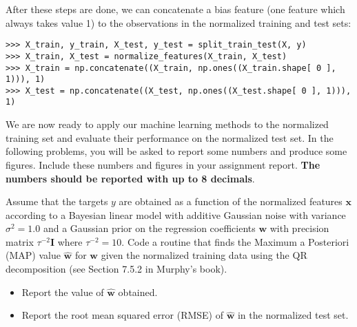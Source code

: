 \documentclass[submit]{harvardml}
\theoremstyle{plain}
\begin{document}
After these steps are done, we can concatenate a bias feature (one feature which
always takes value 1) to the observations in the normalized training and test sets:
\begin{verbatim}
>>> X_train, y_train, X_test, y_test = split_train_test(X, y)
>>> X_train, X_test = normalize_features(X_train, X_test)
>>> X_train = np.concatenate((X_train, np.ones((X_train.shape[ 0 ], 1))), 1)
>>> X_test = np.concatenate((X_test, np.ones((X_test.shape[ 0 ], 1))), 1)
\end{verbatim}
We are now ready to apply our machine learning methods to the normalized training set and
evaluate their performance on the normalized test set.
In the following problems, you will be asked to report some numbers and produce
some figures. Include these numbers and figures in your assignment report.
{\bf The numbers should be reported with up to 8 decimals}.



\begin{problem}[7pts]\label{prob:analytic_linear_model}
Assume that the targets $y$ are obtained as a function of the normalized
features $\mathbf{x}$ according to a Bayesian linear model with additive Gaussian noise with variance
$\sigma^2 = 1.0$ and a Gaussian prior on the regression coefficients $\mathbf{w}$
with precision matrix $\tau^{-2}\mathbf{I}$ where $\tau^{-2} = 10$. Code a routine that finds the Maximum a
Posteriori (MAP) value $\hat{\mathbf{w}}$ for $\mathbf{w}$ given the normalized
training data using the QR decomposition (see Section 7.5.2 in Murphy's book).
\begin{itemize}
\item Report the value of $\hat{\mathbf{w}}$ obtained.
\item Report the root mean squared error (RMSE) of $\hat{\mathbf{w}}$ in the normalized test set.
\end{itemize}
\end{problem}
\end{document}
